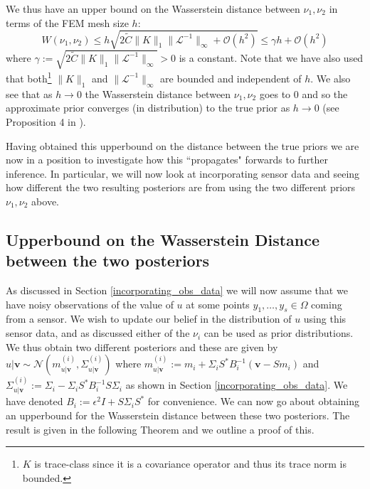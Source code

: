 We thus have an upper bound on the Wasserstein distance between $\nu_{1},\nu_{2}$ in terms of the FEM mesh size $h$:
\begin{equation}
    W(\nu_{1},\nu_{2})\leq h \sqrt{2\tilde{C}\|K\|_{1}\|\mathcal{L}^{-1}\|_{\infty}+\mathcal{O}(h^2)}\leq \gamma h +\mathcal{O}(h^2)
\end{equation}
where $\gamma:=\sqrt{2\tilde{C}\|K\|_{1}\|\mathcal{L}^{-1}\|_{\infty}}>0$ is a constant. Note that we have also used that both\footnote{$K$ is trace-class since it is a covariance operator and thus its trace norm is bounded.} $\|K\|_{1}$ and $\|\mathcal{L}^{-1}\|_{\infty}$ are bounded and independent of $h$. We also see that as $h\rightarrow 0$ the Wasserstein distance between $\nu_1,\nu_2$ goes to 0 and so the approximate prior converges (in distribution) to the true prior as $h\rightarrow 0$ (see Proposition 4 in \textcolor{blue}{\citep{masarotto2019procrustes}}).
\qedsymbol

Having obtained this upperbound on the distance between the true priors we are now in a position to investigate how this ``propagates" forwards to further inference. In particular, we will now look at incorporating sensor data and seeing how different the two resulting posteriors are from using the two different priors $\nu_1,\nu_2$ above.

\subsection{Upperbound on the Wasserstein Distance between the two posteriors}

As discussed in Section \textcolor{blue}{\ref{incorporating_obs_data}} we will now assume that we have noisy observations of the value of $u$ at some points $y_1,\dots,y_s\in\Omega$ coming from a sensor. We wish to update our belief in the distribution of $u$ using this sensor data, and as discussed either of the $\nu_i$ can be used as prior distributions. We thus obtain two different posteriors and these are given by $u|\mathbf{v}\sim\mathcal{N}(m^{(i)}_{u|\mathbf{v}},\Sigma^{(i)}_{u|\mathbf{v}})$ where $m^{(i)}_{u|\mathbf{v}}:=m_{i}+\Sigma_{i}S^{*}B_{i}^{-1}(\mathbf{v}-Sm_{i})$ and $\Sigma^{(i)}_{u|\mathbf{v}}:=\Sigma_{i}-\Sigma_{i}S^{*}B_{i}^{-1}S\Sigma_{i}$ as shown in Section \textcolor{blue}{\ref{incorporating_obs_data}}. We have denoted $B_{i}:=\epsilon^{2}I+S\Sigma_{i}S^{*}$ for convenience. We can now go about obtaining an upperbound for the Wasserstein distance between these two posteriors. The result is given in the following Theorem and we outline a proof of this.
\vspace{5pt}

